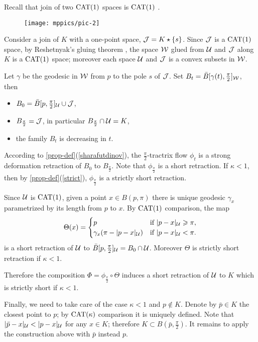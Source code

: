 \documentclass[oneside,a4paper, 12pt]{article}
\begin{document}
Recall that join of two $\mathrm{CAT}(1)$ spaces is $\mathrm{CAT}(1)$ \cite[Corollary 3.14]{bridson-haefliger}.

\begin{wrapfigure}{o}{50 mm}
\vskip-0mm
\centering
\texttt{[image: mppics/pic-2]}
\end{wrapfigure} 

Consider a join of  $K$ with a one-point space, $\mathcal{J}=K\star \{s\}$.
Since $\mathcal{J}$ is a $\mathrm{CAT}(1)$ space,
by Reshetnyak's gluing theorem \cite[8.9.1]{akp}, the space $\mathcal{W}$ glued from ${\mathcal{U}}$ and $\mathcal{J}$ along $K$ is a $\mathrm{CAT}(1)$ space;
moreover each space ${\mathcal{U}}$ and $\mathcal{J}$ is a convex subsets in $\mathcal{W}$.


Let $\gamma$ be the geodesic in $\mathcal{W}$ from $p$ to the pole $s$ of $\mathcal{J}$.
Set $B_t=\bar B[\gamma(t),\tfrac\pi2]_{\mathcal{W}}$, then
\begin{itemize}
\item $B_0=\bar B[p,\tfrac\pi2]_{\mathcal{U}}\cup \mathcal{J}$,
\item $B_{\frac\pi2}=\mathcal{J}$, in particular $B_{\frac\pi2}\cap \mathcal{U}=K$,
\item the family $B_t$ is decreasing in $t$.
\end{itemize}
According to \ref{prop-def}(\ref{sharafutdinov}), the $\tfrac\pi2$-tractrix flow $\phi_t$ is a strong deformation retraction of $B_0$ to $B_{\frac\pi2}$.
Note that $\phi_{\frac\pi2}$ is a short retraction.
If $\kappa<1$, then by \ref{prop-def}(\ref{strict}), $\phi_{\frac\pi2}$ is a strictly short retraction.

Since ${\mathcal{U}}$ is $\mathrm{CAT}(1)$,
given a point $x\in B(p,\pi)$ there is unique geodesic $\gamma_x$ parametrized by its length from $p$ to $x$. 
By $\mathrm{CAT}(1)$ comparison, the map 
\[\Theta(x)=
\begin{cases}
p&\text{if\ }|p-x|_{\mathcal{U}}\geqslant \pi,
\\
\gamma_x(\pi-|p-x|_{\mathcal{U}})&\text{if\ }|p-x|_{\mathcal{U}}< \pi.
\end{cases}
\]
is a short retraction of ${\mathcal{U}}$ to $\bar B[p,\tfrac\pi2]_{\mathcal{U}}=B_0\cap \mathcal{U}$.
Moreover $\Theta$ is strictly short retraction if $\kappa<1$.

Therefore the composition $\Phi=\phi_{\frac\pi2}\circ\Theta$ induces a short retraction of ${\mathcal{U}}$ to $K$
which is strictly short if $\kappa<1$.

Finally, we need to take care of the case $\kappa<1$ and $p\notin K$.
Denote by $\bar p\in K$ the closest point to $p$; by $\mathrm{CAT}(\kappa)$ comparison it is uniquely defined.
Note that $|\bar p-x|_{\mathcal{U}}< |p-x|_{\mathcal{U}}$ for any $x\in K$;
therefore $K\subset B(\bar p,\tfrac\pi2)$. 
It remains to apply the construction above with $\bar p$ instead $p$.
\qeds
\end{document}
